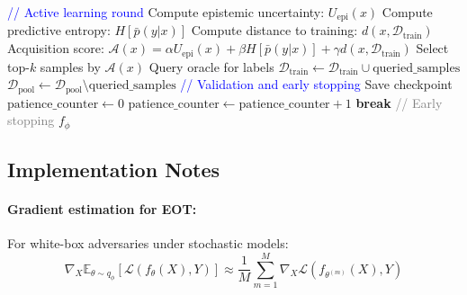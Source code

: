 \documentclass[12pt,a4paper]{article}
\theoremstyle{definition}
\begin{document}
\begin{algorithm}[H]
\ContinuedFloat
\caption{Complete Stochastic Training with EOT and Active Learning (continued)}
\label{alg:complete_training_cont}
\begin{algorithmic}[1]
    \State \textcolor{blue}{// Active learning round}
        \State Compute epistemic uncertainty: $U_{\text{epi}}(x)$
        \State Compute predictive entropy: $H[\bar{p}(y|x)]$
        \State Compute distance to training: $d(x, \mathcal{D}_{\text{train}})$
        \State Acquisition score: $\mathcal{A}(x) = \alpha U_{\text{epi}}(x) + \beta H[\bar{p}(y|x)] + \gamma d(x, \mathcal{D}_{\text{train}})$
      \EndFor
      \State Select top-$k$ samples by $\mathcal{A}(x)$
      \State Query oracle for labels
      \State $\mathcal{D}_{\text{train}} \leftarrow \mathcal{D}_{\text{train}} \cup \text{queried\_samples}$
      \State $\mathcal{D}_{\text{pool}} \leftarrow \mathcal{D}_{\text{pool}} \setminus \text{queried\_samples}$
    \EndIf
    \State \textcolor{blue}{// Validation and early stopping}
      \State Save checkpoint
      \State $\text{patience\_counter} \gets 0$
    \Else
      \State $\text{patience\_counter} \gets \text{patience\_counter} + 1$
        \State \textbf{break} \quad \textcolor{gray}{// Early stopping}
      \EndIf
    \EndIf
  \EndFor
\State \Return $f_\phi$
\end{algorithmic}
\end{algorithm}

\subsection{Implementation Notes}

\paragraph{Gradient estimation for EOT:}
For white-box adversaries under stochastic models:
\begin{equation}
\nabla_X \mathbb{E}_{\theta \sim q_\phi}[\mathcal{L}(f_\theta(X), Y)] \approx \frac{1}{M}\sum_{m=1}^M \nabla_X \mathcal{L}(f_{\theta^{(m)}}(X), Y)
\end{equation}
\end{document}
